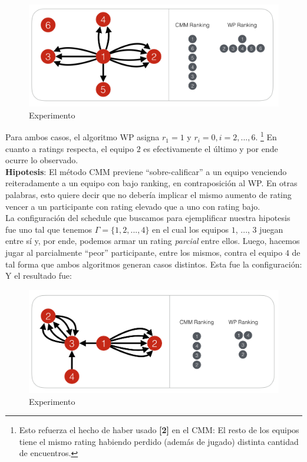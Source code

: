 \begin{figure}[h!]
  \begin{center}
	\includegraphics[scale=0.50]{imagenes/cualitative/comparative/comparative2.png}
	\caption{Experimento}
  \end{center}
\end{figure}

Para ambos casos, el algoritmo WP asigna $r_1 = 1$ y $r_i = 0, i = 2, ..., 6$. \footnote{Esto refuerza el hecho de haber usado \textbf{[2]} en el CMM: El resto de los equipos tiene el mismo rating habiendo perdido (además de jugado) distinta cantidad de encuentros.} En cuanto a ratings respecta, el equipo $2$ es efectivamente el \'ultimo y por ende ocurre lo observado. \\

\textbf{Hipotesis}: El m\'etodo CMM previene ``sobre-calificar'' a un equipo venciendo reiteradamente a un equipo con bajo ranking, en contraposici\'on al WP. En otras palabras, esto quiere decir que no deber\'ia implicar el mismo aumento de rating vencer a un participante con rating elevado que a uno con rating bajo. \\

La configuraci\'on del schedule que buscamos para ejemplificar nuestra hipotesis fue uno tal que tenemos $\Gamma = \{1,2,...,4\}$ en el cual los equipos $1$, ..., $3$ juegan entre s\'i y, por ende, podemos armar un rating \textit{parcial} entre ellos. Luego, hacemos jugar al parcialmente ``peor'' participante, entre los mismos, contra el equipo $4$ de tal forma que ambos algoritmos generan casos distintos. Esta fue la configuraci\'on: \\

Y el resultado fue: \\

\begin{figure}[h!]
  \begin{center}
	\includegraphics[scale=0.50]{imagenes/cualitative/comparative/comparative3.png}
	\caption{Experimento}
  \end{center}
\end{figure}


